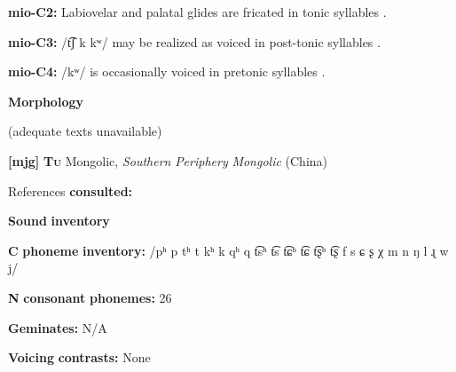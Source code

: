 \begin{styleBody}
\textbf{mio-C2:} Labiovelar and palatal glides are fricated in tonic syllables \citep[8]{Bradley1970}.
\end{styleBody}

\begin{styleBody}
\textbf{mio-C3:} /t͡ʃ k kʷ/ may be realized as voiced in post-tonic syllables \citep[5]{Bradley1970}.
\end{styleBody}

\begin{styleBody}
\textbf{mio-C4:} /kʷ/ is occasionally voiced in pretonic syllables \citep[5]{Bradley1970}.
\end{styleBody}

\begin{styleBody}
\textbf{Morphology}
\end{styleBody}

\begin{styleBody}
(adequate texts unavailable)
\end{styleBody}

\begin{styleBody}
\textbf{[mjg]}   \textbf{\textsc{Tu}}    Mongolic, \textit{Southern} \textit{Periphery} \textit{Mongolic} (China)
\end{styleBody}

\begin{styleBody}
References \textbf{consulted:} \citet{Slater2003}
\end{styleBody}

\begin{styleBody}
\textbf{Sound} \textbf{inventory}
\end{styleBody}

\begin{styleBody}
\textbf{C} \textbf{phoneme} \textbf{inventory:} /pʰ p tʰ t kʰ k qʰ q t͡sʰ t͡s t͡ɕʰ t͡ɕ t͡ʂʰ t͡ʂ f s ɕ ʂ χ m n ŋ l ɻ w j/
\end{styleBody}

\begin{styleBody}
\textbf{N} \textbf{consonant} \textbf{phonemes:} 26
\end{styleBody}

\begin{styleBody}
\textbf{Geminates:} N/A
\end{styleBody}

\begin{styleBody}
\textbf{Voicing} \textbf{contrasts:} None
\end{styleBody}

